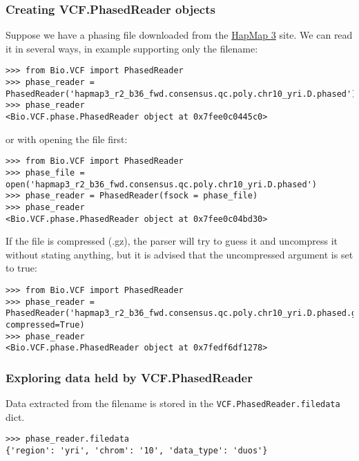 \subsubsection{Creating VCF.PhasedReader objects}

\noindent Suppose we have a phasing file downloaded from the \href{ftp://ftp.hapmap.org/hapmap/phasing/2009-02\_phaseIII/HapMap3\_r2/}{HapMap 3} site.
We can read it in several ways, in example supporting only the filename:

\begin{verbatim}
>>> from Bio.VCF import PhasedReader
>>> phase_reader = PhasedReader('hapmap3_r2_b36_fwd.consensus.qc.poly.chr10_yri.D.phased')
>>> phase_reader
<Bio.VCF.phase.PhasedReader object at 0x7fee0c0445c0>

\end{verbatim}

\noindent or with opening the file first:

\begin{verbatim}
>>> from Bio.VCF import PhasedReader
>>> phase_file = open('hapmap3_r2_b36_fwd.consensus.qc.poly.chr10_yri.D.phased')
>>> phase_reader = PhasedReader(fsock = phase_file)
>>> phase_reader
<Bio.VCF.phase.PhasedReader object at 0x7fee0c04bd30>

\end{verbatim}

\noindent If the file is compressed (.gz), the parser will try to guess it and uncompress it without stating anything, but it is advised that the uncompressed argument is set
to true:

\begin{verbatim}
>>> from Bio.VCF import PhasedReader
>>> phase_reader = PhasedReader('hapmap3_r2_b36_fwd.consensus.qc.poly.chr10_yri.D.phased.gz',
compressed=True)
>>> phase_reader
<Bio.VCF.phase.PhasedReader object at 0x7fedf6df1278>

\end{verbatim}

\subsubsection{Exploring data held by VCF.PhasedReader}

\noindent Data extracted from the filename is stored in the \verb|VCF.PhasedReader.filedata| dict.

\begin{verbatim}
>>> phase_reader.filedata
{'region': 'yri', 'chrom': '10', 'data_type': 'duos'}

\end{verbatim}

